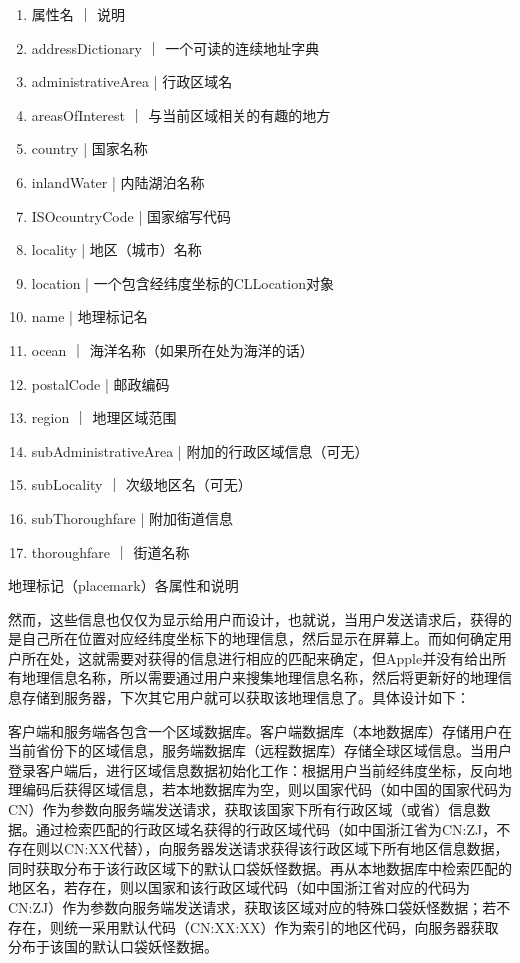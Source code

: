 \documentclass{article}
\begin{document}
\begin{CJK}{UTF8}{gbsn}
  \begin{enumerate}
		\item 属性名 ｜ 说明
		\item addressDictionary ｜ 一个可读的连续地址字典
		\item administrativeArea | 行政区域名
		\item areasOfInterest ｜ 与当前区域相关的有趣的地方
		\item country | 国家名称
		\item inlandWater | 内陆湖泊名称
		\item ISOcountryCode | 国家缩写代码
		\item locality | 地区（城市）名称
		\item location | 一个包含经纬度坐标的CLLocation对象
		\item name | 地理标记名
		\item ocean ｜ 海洋名称（如果所在处为海洋的话）
		\item postalCode | 邮政编码
		\item region ｜ 地理区域范围
		\item subAdministrativeArea | 附加的行政区域信息（可无）
		\item subLocality ｜ 次级地区名（可无）
		\item subThoroughfare | 附加街道信息
		\item thoroughfare ｜ 街道名称
  \end{enumerate}
  地理标记（placemark）各属性和说明
  
  然而，这些信息也仅仅为显示给用户而设计，也就说，当用户发送请求后，获得的是自己所在位置对应经纬度坐标下的地理信息，然后显示在屏幕上。而如何确定用户所在处，这就需要对获得的信息进行相应的匹配来确定，但Apple并没有给出所有地理信息名称，所以需要通过用户来搜集地理信息名称，然后将更新好的地理信息存储到服务器，下次其它用户就可以获取该地理信息了。具体设计如下：

  客户端和服务端各包含一个区域数据库。客户端数据库（本地数据库）存储用户在当前省份下的区域信息，服务端数据库（远程数据库）存储全球区域信息。当用户登录客户端后，进行区域信息数据初始化工作：根据用户当前经纬度坐标，反向地理编码后获得区域信息，若本地数据库为空，则以国家代码（如中国的国家代码为CN）作为参数向服务端发送请求，获取该国家下所有行政区域（或省）信息数据。通过检索匹配的行政区域名获得的行政区域代码（如中国浙江省为CN:ZJ，不存在则以CN:XX代替），向服务器发送请求获得该行政区域下所有地区信息数据，同时获取分布于该行政区域下的默认口袋妖怪数据。再从本地数据库中检索匹配的地区名，若存在，则以国家和该行政区域代码（如中国浙江省对应的代码为CN:ZJ）作为参数向服务端发送请求，获取该区域对应的特殊口袋妖怪数据；若不存在，则统一采用默认代码（CN:XX:XX）作为索引的地区代码，向服务器获取分布于该国的默认口袋妖怪数据。


\end{CJK}
\end{document}

